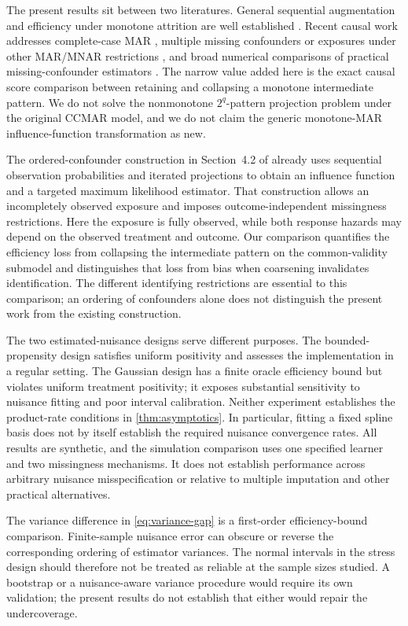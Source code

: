 \documentclass[11pt]{article}
\theoremstyle{definition}
\newcommand{\1}{\mathbf{1}}
\begin{document}
The present results sit between two literatures. General sequential augmentation and efficiency under monotone attrition are well established \citep{rrz1994,gill1997,barnwell2025}. Recent causal work addresses complete-case MAR \citep{levis2025}, multiple missing confounders or exposures under other MAR/MNAR restrictions \citep{wen2026}, and broad numerical comparisons of practical missing-confounder estimators \citep{benz2025,williamson2026}. The narrow value added here is the exact causal score comparison between retaining and collapsing a monotone intermediate pattern. We do not solve the nonmonotone $2^q$-pattern projection problem under the original CCMAR model, and we do not claim the generic monotone-MAR influence-function transformation as new.

The ordered-confounder construction in Section~4.2 of \citet{wen2026} already uses sequential observation probabilities and iterated projections to obtain an influence function and a targeted maximum likelihood estimator. That construction allows an incompletely observed exposure and imposes outcome-independent missingness restrictions. Here the exposure is fully observed, while both response hazards may depend on the observed treatment and outcome. Our comparison quantifies the efficiency loss from collapsing the intermediate pattern on the common-validity submodel and distinguishes that loss from bias when coarsening invalidates identification. The different identifying restrictions are essential to this comparison; an ordering of confounders alone does not distinguish the present work from the existing construction.

The two estimated-nuisance designs serve different purposes. The bounded-propensity design satisfies uniform positivity and assesses the implementation in a regular setting. The Gaussian design has a finite oracle efficiency bound but violates uniform treatment positivity; it exposes substantial sensitivity to nuisance fitting and poor interval calibration. Neither experiment establishes the product-rate conditions in \cref{thm:asymptotics}. In particular, fitting a fixed spline basis does not by itself establish the required nuisance convergence rates. All results are synthetic, and the simulation comparison uses one specified learner and two missingness mechanisms. It does not establish performance across arbitrary nuisance misspecification or relative to multiple imputation and other practical alternatives.

The variance difference in \cref{eq:variance-gap} is a first-order efficiency-bound comparison. Finite-sample nuisance error can obscure or reverse the corresponding ordering of estimator variances. The normal intervals in the stress design should therefore not be treated as reliable at the sample sizes studied. A bootstrap or a nuisance-aware variance procedure would require its own validation; the present results do not establish that either would repair the undercoverage.
\end{document}
